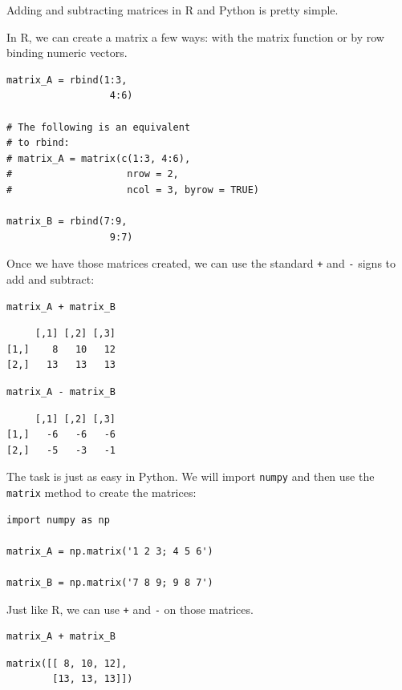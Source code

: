 \documentclass[
  letterpaper,
]{krantz}
\begin{document}
Adding and subtracting matrices in R and Python is pretty simple.

In R, we can create a matrix a few ways: with the matrix function or by
row binding numeric vectors.

\begin{verbatim}
matrix_A = rbind(1:3, 
                  4:6)

# The following is an equivalent
# to rbind:
# matrix_A = matrix(c(1:3, 4:6), 
#                    nrow = 2, 
#                    ncol = 3, byrow = TRUE)

matrix_B = rbind(7:9, 
                  9:7)
\end{verbatim}

Once we have those matrices created, we can use the standard \texttt{+}
and \texttt{-} signs to add and subtract:

\begin{verbatim}
matrix_A + matrix_B
\end{verbatim}

\begin{verbatim}
     [,1] [,2] [,3]
[1,]    8   10   12
[2,]   13   13   13
\end{verbatim}

\begin{verbatim}
matrix_A - matrix_B
\end{verbatim}

\begin{verbatim}
     [,1] [,2] [,3]
[1,]   -6   -6   -6
[2,]   -5   -3   -1
\end{verbatim}

The task is just as easy in Python. We will import \texttt{numpy} and
then use the \texttt{matrix} method to create the matrices:

\begin{verbatim}
import numpy as np

matrix_A = np.matrix('1 2 3; 4 5 6')

matrix_B = np.matrix('7 8 9; 9 8 7')
\end{verbatim}

Just like R, we can use \texttt{+} and \texttt{-} on those matrices.

\begin{verbatim}
matrix_A + matrix_B
\end{verbatim}

\begin{verbatim}
matrix([[ 8, 10, 12],
        [13, 13, 13]])
\end{verbatim}
\end{document}
